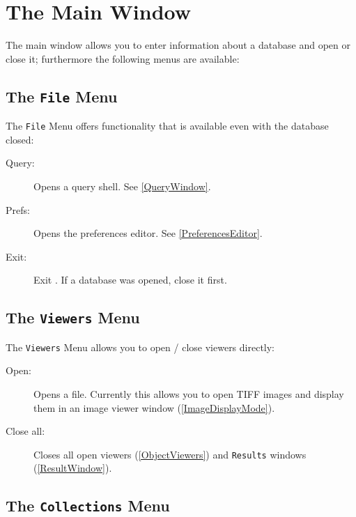 \documentclass[11pt]{article}
\begin{document}
\section{The Main Window}
\label{MainWindow}

The main window allows you to enter information about a database and open or
close it; furthermore the following menus are available:

\subsection{The \texttt{File} Menu}

The \texttt{File} Menu offers functionality that is available even with the
database closed:

\begin{description}

\item[Query:] Opens a query shell. See \ref{QueryWindow}.

\item[Prefs:] Opens the preferences editor. See \ref{PreferencesEditor}.

\item[Exit:] Exit \rview. If a database was opened, close it first.

\end{description}


\subsection{The \texttt{Viewers} Menu}

The \texttt{Viewers} Menu allows you to open / close viewers directly:

\begin{description}

\item[Open:] Opens a file. Currently this allows you to open TIFF images
and display them in an image viewer window (\ref{ImageDisplayMode}).

\item[Close all:] Closes all open viewers (\ref{ObjectViewers}) and \texttt{Results}
windows (\ref{ResultWindow}).

\end{description}


\subsection{The \texttt{Collections} Menu}
\end{document}
